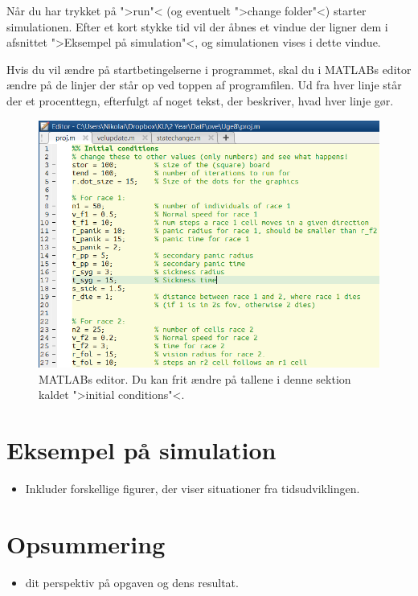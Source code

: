 \documentclass[a4paper,10pt]{article} 	%
\numberwithin{equation}{section}
\begin{document}
	Når du har trykket på ">run"< (og eventuelt ">change folder"<) starter simulationen. Efter et kort stykke tid vil der åbnes et vindue der ligner dem i afsnittet ">Eksempel på simulation"<, og simulationen vises i dette vindue.
	
	Hvis du vil ændre på startbetingelserne i programmet, skal du i MATLABs editor ændre på de linjer der står op ved toppen af programfilen. Ud fra hver linje står der et procenttegn, efterfulgt af noget tekst, der beskriver, hvad hver linje gør.
	
	\begin{figure}[H]
		\centering
		\includegraphics[width=12cm]{img/editor.png}
		\caption{MATLABs editor. Du kan frit ændre på tallene i denne sektion kaldet ">initial conditions"<.}
		\label{fig_editor}
	\end{figure}
	
	
	\section{Eksempel på simulation}
	\begin{itemize}
		\item Inkluder forskellige figurer, der viser situationer fra tidsudviklingen.
	\end{itemize}


	\section{Opsummering}
	\begin{itemize}
		\item dit perspektiv på opgaven og dens resultat.
	\end{itemize}
	
\end{document}
